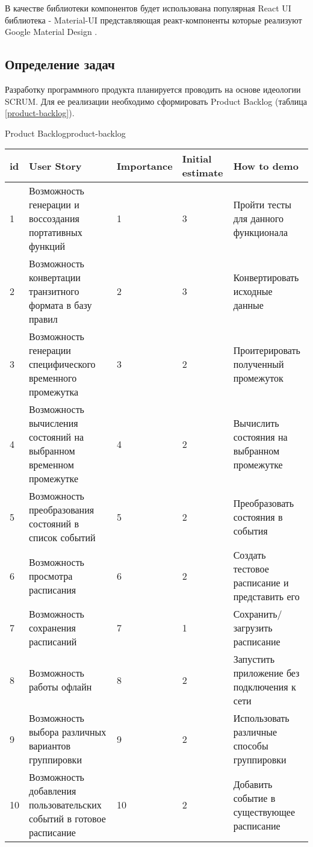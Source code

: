 В качестве библиотеки компонентов будет использована популярная React UI библиотека - Material-UI представляющая реакт-компоненты которые реализуют Google Material Design \cite{material-design}.

\subsection{Определение задач}

Разработку программного продукта планируется проводить на основе идеологии SCRUM.
Для ее реализации необходимо сформировать Product Backlog (таблица \ref{product-backlog}).

\begin{tbl}{Product Backlog}{product-backlog}
  \begin{tabularx}{\textwidth}{| p{0.5cm} | p{4.5cm} | p{2cm} | p{1.5cm} | X |}
  \hline id & User Story                                                           & Importance & Initial estimate & How to demo \\
  \hline 1  & Возможность генерации и воссоздания портативных функций              & 1          & 3                & Пройти тесты для данного функционала \\
  \hline 2  & Возможность конвертации транзитного формата в базу правил            & 2          & 3                & Конвертировать исходные данные \\
  \hline 3  & Возможность генерации специфического временного промежутка           & 3          & 2                & Проитерировать полученный промежуток \\
  \hline 4  & Возможность вычисления состояний на выбранном временном промежутке   & 4          & 2                & Вычислить состояния на выбранном промежутке \\
  \hline 5  & Возможность преобразования состояний в список событий                & 5          & 2                & Преобразовать состояния в события \\
  \hline 6  & Возможность просмотра расписания                                     & 6          & 2                & Создать тестовое расписание и представить его \\
  \hline 7  & Возможность сохранения расписаний                                    & 7          & 1                & Сохранить/загрузить расписание \\
  \hline 8  & Возможность работы офлайн                                            & 8          & 2                & Запустить приложение без подключения к сети \\
  \hline 9  & Возможность выбора различных вариантов группировки                   & 9          & 2                & Использовать различные способы группировки \\
  \hline 10 & Возможность добавления пользовательских событий в готовое расписание & 10         & 2                & Добавить событие в существующее расписание \\
  \hline
  \end{tabularx}
\end{tbl}

\clearpage